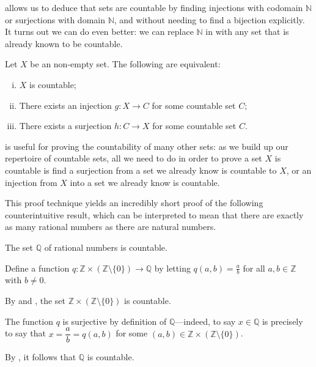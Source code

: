  allows us to deduce that sets are countable by finding injections with codomain $\mathbb{N}$ or surjections with domain $\mathbb{N}$, and without needing to find a bijection explicitly. It turns out we can do even better: we can replace $\mathbb{N}$ in  with any set that is already known to be countable.

\begin{exercise}
\label{exCountabilityFromInjectionsAndSurjections}
Let $X$ be an non-empty set. The following are equivalent:
\begin{enumerate}[(i)]
\item \label{itmInjectionSurjectionCountableSets} $X$ is countable;
\item \label{itmInjectionIntoCountableSet} There exists an injection $g : X \to C$ for some countable set $C$;
\item \label{itmSurjectionFromCountableSet} There exists a surjection $h : C \to X$ for some countable set $C$.
\end{enumerate}
\end{exercise}

 is useful for proving the countability of many other sets: as we build up our repertoire of countable sets, all we need to do in order to prove a set $X$ is countable is find a surjection from a set we already know is countable to $X$, or an injection from $X$ into a set we already know is countable.

This proof technique yields an incredibly short proof of the following counterintuitive result, which can be interpreted to mean that there are exactly as many rational numbers as there are natural numbers.

\begin{theorem}
\label{thmRationalsAreCountable}
The set $\mathbb{Q}$ of rational numbers is countable.
\end{theorem}

\begin{cproof}
Define a function $q : \mathbb{Z} \times (\mathbb{Z} \setminus \{ 0 \}) \to \mathbb{Q}$ by letting $q(a,b) = \frac{a}{b}$ for all $a,b \in \mathbb{Z}$ with $b \ne 0$.

By  and , the set $\mathbb{Z} \times (\mathbb{Z} \setminus \{ 0 \})$ is countable.

The function $q$ is surjective by definition of $\mathbb{Q}$---indeed, to say $x \in \mathbb{Q}$ is precisely to say that $x = \dfrac{a}{b} = q(a,b)$ for some $(a,b) \in \mathbb{Z} \times (\mathbb{Z} \setminus \{ 0 \})$.

By , it follows that $\mathbb{Q}$ is countable.
\end{cproof}

